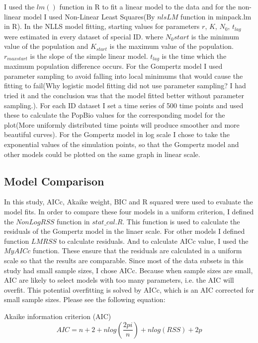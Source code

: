 \documentclass[11pt]{article}
\begin{document}
\begin{linenumbers}
    I used the $lm()$ function in R to fit a linear model to the data and for the non-linear model I used Non-Linear Least Squares(By $nlsLM$ function in minpack.lm in R). In the NLLS model fitting, starting values for parameters $r$, $K$, $N_0$, $t_{lag}$ were estimated in every dataset of special ID. where $N_0{start}$ is the minimum value of the population and $K_{start}$ is the maximum value of the population. $r_{maxstart}$ is the slope of the simple linear model. $t_{lag}$ is the time which the maximum population difference occurs. For the Gompertz model I used parameter sampling to avoid falling into local minimums that would cause the fitting to fail(Why logistic model fitting did not use parameter sampling? I had tried it and the conclusion was that the model fitted better without parameter sampling.). For each ID dataset I set a time series of 500 time points and used these to calculate the PopBio values for the corresponding model for the plot(More uniformly distributed time points will produce smoother and more beautiful curves). For the Gompertz model in log scale I chose to take the exponential values of the simulation points, so that the Gompertz model and other models could be plotted on the same graph in linear scale.

      \subsection{Model Comparison}

    In this study, AICc, Akaike weight, BIC and R squared were used to evaluate the model fits. In order to compare these four models in a uniform criterion, I defined the $NonLogRSS$ function in $stat\_cal.R$. This function is used to calculate the residuals of the Gompertz model in the linaer scale. For other models I defined function $LMRSS$ to calculate residuals. And to calculate AICc value, I used the $MyAICc$ function. These ensure that the residuals are calculated in a uniform scale so that the results are comparable. Since most of the data subsets in this study had small sample sizes, I chose AICc. Because when sample sizes are small, AIC are likely to select models with too many parameters, i.e. the AIC will overfit. This potential overfitting is solved by AICc, which is an AIC corrected for small sample sizes. Please see the following equation:

    Akaike information criterion (AIC)
      \begin{equation}
        AIC = n + 2 + n log(\frac{2 pi}{n}) + n log(RSS) + 2 p
      \end{equation}
      

\end{linenumbers}
\end{document}
